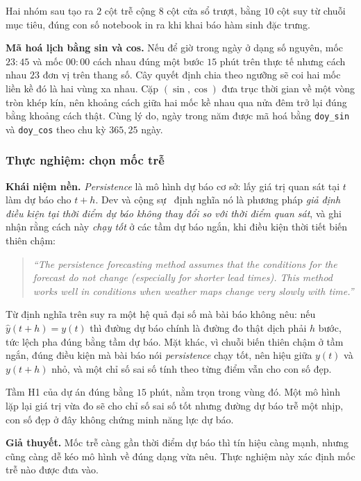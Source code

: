 \documentclass[12pt, a4paper]{report}
\begin{document}
Hai nhóm sau tạo ra $2$ cột trễ cộng $8$ cột cửa sổ trượt, bằng $10$ cột suy từ chuỗi mục
tiêu, đúng con số notebook in ra khi khai báo hàm sinh đặc trưng.

\textbf{Mã hoá lịch bằng sin và cos.} Nếu để giờ trong ngày ở dạng số nguyên, mốc $23{:}45$
và mốc $00{:}00$ cách nhau đúng một bước $15$ phút trên thực tế nhưng cách nhau $23$ đơn vị
trên thang số. Cây quyết định chia theo ngưỡng sẽ coi hai mốc liền kề đó là hai vùng xa
nhau. Cặp $(\sin, \cos)$ đưa trục thời gian về một vòng tròn khép kín, nên khoảng cách giữa
hai mốc kề nhau qua nửa đêm trở lại đúng bằng khoảng cách thật. Cùng lý do, ngày trong năm
được mã hoá bằng \texttt{doy\_sin} và \texttt{doy\_cos} theo chu kỳ $365{,}25$ ngày.

\subsubsection{Thực nghiệm: chọn mốc trễ}

\textbf{Khái niệm nền.} \textit{Persistence} là mô hình dự báo cơ sở: lấy giá trị quan sát
tại $t$ làm dự báo cho $t+h$. Dev và cộng sự~\cite{dev2018tes} định nghĩa nó là phương pháp
\textit{giả định điều kiện tại thời điểm dự báo không thay đổi so với thời điểm quan sát},
và ghi nhận rằng cách này \textit{chạy tốt} ở các tầm dự báo ngắn, khi điều kiện thời tiết
biến thiên chậm:

\begin{quote}\small
\textit{``The persistence forecasting method assumes that the conditions for the forecast do not change (especially for shorter lead times). This method works well in conditions when weather maps change very slowly with time.''}
\end{quote}


Từ định nghĩa trên suy ra một hệ quả đại số mà bài báo không nêu: nếu $\hat{y}(t+h) = y(t)$
thì đường dự báo chính là đường đo thật dịch phải $h$ bước, tức lệch pha đúng bằng
tầm dự báo. Mặt khác, vì chuỗi biến thiên chậm ở tầm ngắn, đúng điều kiện mà bài báo nói
\textit{persistence} chạy tốt, nên hiệu giữa $y(t)$ và $y(t+h)$ nhỏ, và một chỉ số sai số
tính theo từng điểm vẫn cho con số đẹp.

Tầm H1 của dự án đúng bằng $15$ phút, nằm trọn trong vùng đó. Một mô hình lặp lại giá trị vừa
đo sẽ cho chỉ số sai số tốt nhưng đường dự báo trễ một nhịp, con số đẹp
ở đây không chứng minh năng lực dự báo.

\textbf{Giả thuyết.} Mốc trễ càng gần thời điểm dự báo thì tín hiệu càng mạnh, nhưng cũng
càng dễ kéo mô hình về đúng dạng vừa nêu. Thực nghiệm này xác định mốc trễ nào được đưa vào.
\end{document}
